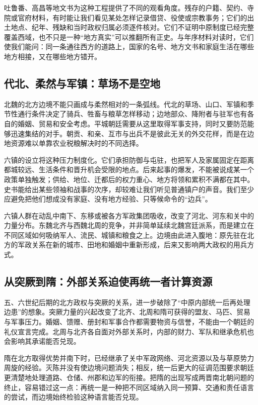 吐鲁番、高昌等地文书为这种工程提供了不同的观看角度。残存的户籍、契约、寺院或官府材料，有时能让我们看见某处怎样记录借贷、役使或宗教事务；它们的出土地点、纪年、残缺和当时政权归属必须逐件核对。它们不证明中原制度已经完整覆盖西域，也不只是一种“地方真实”可以推翻所有正史。与年序材料对读时，它们使我们能问：同一条通往西方的道路上，国家的名号、地方文书和家庭生活在哪些地方相接，又在哪些地方错开。

\subsection{代北、柔然与军镇：草场不是空地}

北魏的北方边境不能只画成与柔然相对的一条弧线。代北的草场、山口、军镇和季节性通行条件决定了骑兵、牲畜与粮草怎样移动；边地部众、降附者与驻军也有各自的婚姻、贸易和安全考虑。平城朝廷需要从这里取得军事支持，同时又要防范能够迅速集结的对手。朝贡、和亲、互市与出兵不是彼此无关的外交花样，而是在边地资源难以单靠农业税粮解决时的不同选择。

六镇的设立将这种压力制度化。它们承担防御与屯驻，也把军人及家属固定在距离都城较远、生活条件和晋升机会受限的地点。后来起事的爆发，不能被说成某一个政策单独触发；供给、地位、迁都后的权力重心、地方将领和累积不满都在其中。史书能给出某些领袖和战事的次序，却较难让我们听见普通镇户的声音。我们至少应避免把他们想成没有家庭、没有地方经验、只等候命令的“边兵”。

六镇人群在动乱中南下、东移或被各方军政集团吸收，改变了河北、河东和关中的力量分布。东魏北齐与西魏北周的竞争，并非简单延续北魏宫廷派系，而是建立在不同区域如何吸纳军人、流民、城镇和粮食之上。边境由此进入腹地：原先驻在北方的军政关系在新的城市、田地和婚姻中重新形成，后来又影响两大政权的用兵方式。

\subsection{从突厥到隋：外部关系迫使再统一者计算资源}

五、六世纪后期的北方政权与突厥的关系，进一步破除了“中原内部统一后再处理边患”的想象。突厥力量的兴起改变了北齐、北周和隋可获得的盟友、马匹、贸易与军事压力。婚姻、馈赠、册封和军事合作都需要物资与信誉，不能由一个朝廷的礼仪宣言完成。北周与北齐各自面对外部关系时，内部的财力、军队和继承危机也会影响其承诺能否兑现。

隋在北方取得优势并南下时，已经继承了关中军政网络、河北资源以及与草原势力周旋的经验。灭陈并没有使边境问题消失；相反，统一后更大的征调范围要求朝廷更清楚地处理道路、仓储、州郡和边军的衔接。把隋的出现写成两晋南北朝问题的终止，容易错过这一点：再统一是一种把不同区域纳入同一预算、交通和责任语言的尝试，而边境始终检验这种语言能否兑现。

